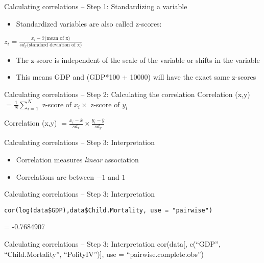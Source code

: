 \documentclass[presentation]{beamer}
\begin{document}
\begin{frame}[label={sec:org55a18bb}]{Calculating correlations -- Step 1: Standardizing a variable}
\begin{itemize}
\item Standardized variables are also called z-scores:
\end{itemize}
\(z_{i} = \frac{x_{i} - \bar{x} \text{(mean of x)}}{sd_{x} \text{(standard deviation of x)}}\)

\begin{itemize}
\item The z-score is independent of the scale of the variable or shifts in the variable
\end{itemize}
\pause

\begin{itemize}
\item This means GDP and (GDP*100 + 10000) will have the exact same z-scores
\end{itemize}
\end{frame}

\begin{frame}[label={sec:org7c38ef5}]{Calculating correlations -- Step 2: Calculating the correlation}
Correlation (x,y) \(= \frac{1}{N} \sum^{N}_{i=1}\) z-score of \(x_i \times\) z-score of \(y_{i}\)

\pause

Correlation (x,y) \(= \frac{x_{i} - \bar{x}}{sd_{x}} \times   \frac{y_{i} - \bar{y}}{sd_{y}}\)
\end{frame}

\begin{frame}[label={sec:org9aad10f}]{Calculating correlations -- Step 3: Interpretation}
\begin{itemize}
\item Correlation measures \emph{linear} association
\item Correlations are between \(-1\) and \(1\)
\end{itemize}
\end{frame}

\begin{frame}[fragile,label={sec:org5f3d418}]{Calculating correlations -- Step 3: Interpretation}
 \begin{verbatim}
cor(log(data$GDP),data$Child.Mortality, use = "pairwise")
\end{verbatim}

= -0.7684907
\end{frame}

\begin{frame}[label={sec:org11bf730}]{Calculating correlations -- Step 3: Interpretation}
cor(data[, c(``GDP'', ``Child.Mortality'', ``PolityIV'')], use = ``pairwise.complete.obs'')
\end{frame}
\end{document}

